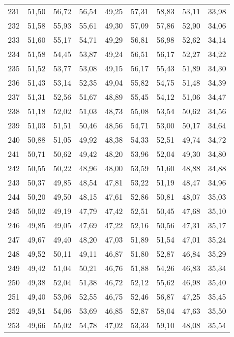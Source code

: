 \begin{longtable}{c c c c c c c c c}
      231& 	51,50& 	56,72& 	56,54& 	49,25& 	57,31& 	58,83& 	53,11& 	33,98 \\
      232& 	51,58& 	55,93& 	55,61& 	49,30& 	57,09& 	57,86& 	52,90& 	34,06 \\
      233& 	51,60& 	55,17& 	54,71& 	49,29& 	56,81& 	56,98& 	52,62& 	34,14 \\
      234& 	51,58& 	54,45& 	53,87& 	49,24& 	56,51& 	56,17& 	52,27& 	34,22 \\
      235& 	51,52& 	53,77& 	53,08& 	49,15& 	56,17& 	55,43& 	51,89& 	34,30 \\
      236& 	51,43& 	53,14& 	52,35& 	49,04& 	55,82& 	54,75& 	51,48& 	34,39 \\
      237& 	51,31& 	52,56& 	51,67& 	48,89& 	55,45& 	54,12& 	51,06& 	34,47 \\
      238& 	51,18& 	52,02& 	51,03& 	48,73& 	55,08& 	53,54& 	50,62& 	34,56 \\
      239& 	51,03& 	51,51& 	50,46& 	48,56& 	54,71& 	53,00& 	50,17& 	34,64 \\
      240& 	50,88& 	51,05& 	49,92& 	48,38& 	54,33& 	52,51& 	49,74& 	34,72 \\
      241& 	50,71& 	50,62& 	49,42& 	48,20& 	53,96& 	52,04& 	49,30& 	34,80 \\
      242& 	50,55& 	50,22& 	48,96& 	48,00& 	53,59& 	51,60& 	48,88& 	34,88 \\
      243& 	50,37& 	49,85& 	48,54& 	47,81& 	53,22& 	51,19& 	48,47& 	34,96 \\
      244& 	50,20& 	49,50& 	48,15& 	47,61& 	52,86& 	50,81& 	48,07& 	35,03 \\
      245& 	50,02& 	49,19& 	47,79& 	47,42& 	52,51& 	50,45& 	47,68& 	35,10 \\
      246& 	49,85& 	49,05& 	47,69& 	47,22& 	52,16& 	50,56& 	47,31& 	35,17 \\
      247& 	49,67& 	49,40& 	48,20& 	47,03& 	51,89& 	51,54& 	47,01& 	35,24 \\
      248& 	49,52& 	50,11& 	49,11& 	46,87& 	51,80& 	52,87& 	46,84& 	35,29 \\
      249& 	49,42& 	51,04& 	50,21& 	46,76& 	51,88& 	54,26& 	46,83& 	35,34 \\
      250& 	49,38& 	52,04& 	51,38& 	46,72& 	52,12& 	55,62& 	46,98& 	35,40 \\
      251& 	49,40& 	53,06& 	52,55& 	46,75& 	52,46& 	56,87& 	47,25& 	35,45 \\
      252& 	49,51& 	54,06& 	53,69& 	46,85& 	52,87& 	58,04& 	47,63& 	35,50 \\
      253& 	49,66& 	55,02& 	54,78& 	47,02& 	53,33& 	59,10& 	48,08& 	35,54 \\

\end{longtable}
